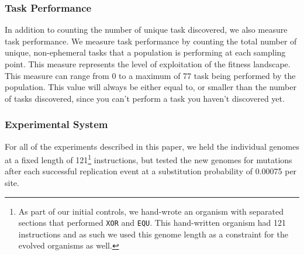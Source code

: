 \documentclass[10pt,letterpaper]{article}
\begin{document}
\subsubsection*{Task Performance}
In addition to counting the number of unique task discovered, we also measure task performance. We measure task performance by counting the total number of unique, non-ephemeral tasks that a population is performing at each sampling point. This measure represents the level of exploitation of the fitness landscape. This measure can range from 0 to a maximum of 77 task being performed by the population. This value will always be either equal to, or smaller than the number of tasks discovered, since you can't perform a task you haven't discovered yet.   

\subsubsection*{Experimental System}
For all of the experiments described in this paper, we held the individual genomes at a fixed length of 121\footnote{As part of our initial controls, we hand-wrote an organism with separated sections that performed \texttt{XOR} and \texttt{EQU}. This hand-written organism had 121 instructions and as such we used this genome length as a constraint for the evolved organisms as well.} instructions, but tested the new genomes for mutations after each successful replication event at a substitution probability of 0.00075 per site. 
\end{document}

